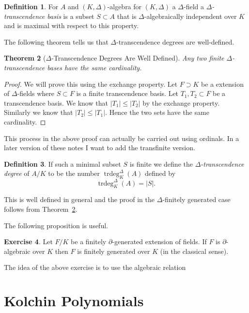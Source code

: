 \documentclass[12pt]{book}
\numberwithin{equation}{section}
\newtheorem{theorem}{Theorem}[subsection]
\theoremstyle{definition}
\newtheorem{definition}[theorem]{Definition}
\newtheorem{exercise}[theorem]{Exercise}
\theoremstyle{remark}
\newcommand{\trdeg}{\operatorname{trdeg}}
\begin{document}
\begin{definition}
	For $A$ and $(K,\Delta)$-algebra for $(K,\Delta)$ a $\Delta$-field a \emph{$\Delta$-transcendence basis} is a subset $S \subset A$ that is $\Delta$-algebraically independent over $K$ and is maximal with respect to this property. 
\end{definition}

The following theorem tells us that $\Delta$-transcendence degrees are well-defined. 
\begin{theorem}[$\Delta$-Transcendence Degrees Are Well Defined]\label{T:transcendence-degrees}
	Any two finite $\Delta$-transcendence bases have the same cardinality.
\end{theorem}
\begin{proof}
	We will prove this using the exchange property. 
	Let $F \supset K$ be a extension of $\Delta$-fields where $S \subset F$ is a finite transcendence basis. 
	Let $T_1,T_2 \subset F$ be a transcendence basis. 
	We know that $\vert T_1 \vert \leq \vert T_2 \vert$ by the exchange property. 
	Similarly we know that $\vert T_2 \vert \leq \vert T_1 \vert$.
	Hence the two sets have the same cardinality. 
\end{proof}
This process in the above proof can actually be carried out using ordinals.
In a later version of these notes I want to add the transfinite version.

\begin{definition}
	If such a minimal subset $S$ is finite we define the \emph{$\Delta$-transcendence degree} of $A/K$ to be the number $\trdeg^{\Delta}_K(A)$ defined by 
	$$ \trdeg_K^{\Delta}(A) = \vert S \vert.$$
\end{definition}
This is well defined in general and the proof in the $\Delta$-finitely generated case follows from Theorem~\ref{T:transcendence-degrees}.

The following proposition is useful. 
\begin{exercise}
	Let $F/K$ be a finitely $\partial$-generated extension of fields. 
	If $F$ is $\partial$-algebraic over $K$ then $F$ is finitely generated over $K$ (in the classical sense).
\end{exercise}
The idea of the above exercise is to use the algebraic relation 


\section{Kolchin Polynomials}
\end{document}
